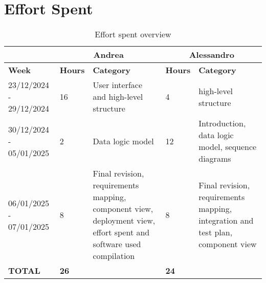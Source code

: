 \chapter{Effort Spent}
\begin{center}
	\begin{table}[H]
		\begin{tabular}{ | m{4cm} | m{1cm}| m{4cm} | m{1cm}| m{4cm} | } 
			\hline
			&  \multicolumn{2}{c|}{ Andrea} & \multicolumn{2}{c|}{ Alessandro} \\ 
			\hline
			\textbf{Week} & \textbf{Hours}   & \textbf{Category} & \textbf{Hours}       & \textbf{Category} \\
			\hline
			23/12/2024 - 29/12/2024 & 16 & User interface and high-level structure & 4 & high-level structure\\
			\hline
			30/12/2024 - 05/01/2025 & 2 & Data logic model & 12 & Introduction, data logic model, sequence diagrams\\
			\hline
			06/01/2025 - 07/01/2025 & 8 & Final revision, requirements mapping, component view, deployment view, effort spent and software used compilation & 8 & Final revision, requirements mapping, integration and test plan, component view\\
			\hline
			\textbf{TOTAL} & \textbf{26} & & \textbf{24} & \\
			\hline
		\end{tabular}
		\caption{Effort spent overview}
	\end{table}
\end{center}